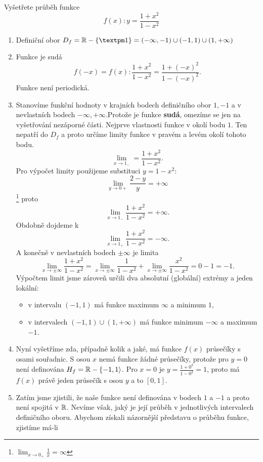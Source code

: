 \begin{example}\label{mai:exam003}
  Vyšetřete průběh funkce $$f(x):y=\frac{1+x^2}{1-x^2}$$
  \begin{enumerate}
    \item Definiční obor $D_f=\realset-\{±1\}=(-\infty,-1)\cup(-1,1)\cup(1,+\infty)$
    \item Funkce je sudá $$f(-x)=f(x): \frac{1+x^2}{1-x^2}=\frac{1+(-x)^2}{1-(-x)^2}.$$ Funkce  
         není periodická.
    \item Stanovíme funkční hodnoty v krajních bodech definičního obor $1, -1$ a v nevlastních  
         bodech $-\infty,+\infty$.Protože je funkce \textbf{sudá}, omezíme se jen na vyšetřování 
         nezáporné části. Nejprve vlastnosti fun\-kce v okolí bodu $1$. Ten nepatří do $D_f$ a 
         proto určíme limity funkce v pravém a levém okolí tohoto bodu. $$\lim_{x\to 
         1_{-}}=\frac{1+x^2}{1-x^2}.$$ Pro výpočet limity použijeme substituci $y=1-x^2$: 
         $$\lim_{y\to0+}\frac{2-y}{y}=+\infty$$ 
         \footnote{$\lim_{x\to0_+}\frac{1}{x}=\infty$} proto 
         $$\lim_{x\to1_{-}}\frac{1+x^2}{1-x^2}=+\infty.$$ 
         Obdobně dojdeme k $$\lim_{x\to1_+}\frac{1+x^2}{1-x^2}=-\infty.$$ A konečně v nevlastních 
         bodech $±\infty$ je limita $$\lim_{x\to±\infty}\frac{1+x^2}{1-x^2} = 
         \lim_{x\to\pm\infty}\frac{1}{1-x^2} + \lim_{x\to\pm\infty}\frac{x^2}{1-x^2}=0-1=-1.$$ 
         Výpočtem limit jsme zároveň určili dva absolutní (globální) extrémy a jeden lokální:
         \begin{itemize}
           \item v intervalu $(-1,1)$ má funkce maximum $\infty$ a minimum $1$,
           \item v intervalech $(-1,1)\cup(1,+\infty)$ má funkce minimum $-\infty$ a maximum $-1$.
         \end{itemize}
    \item Nyní vyšetříme zda, případně kolik a jaké, má funkce $f(x)$ průsečíky s osami souřadnic.  
         S osou $x$ nemá funkce žádné průsečíky, protože pro $y=0$ není definována 
         $H_f=\mathbb{R}-\{-1,1\rangle$. Pro $x=0$ je $y=\frac{1+0^2}{1-0^2}=1$, proto má $f(x)$ 
         právě jeden průsečík s osou $y$ a to $[0,1]$.
    \item Zatím jsme zjistili, že naše funkce není definována v bodech $1$ a $-1$ a proto není  
         spojitá v  $\mathbb{R}$. Nevíme však, jaký je její průběh v jednotlivých intervalech 
         definičního oboru.  Abychom získali názornější představu o průběhu funkce, zjistíme má-li 

\end{enumerate}
\end{example}
